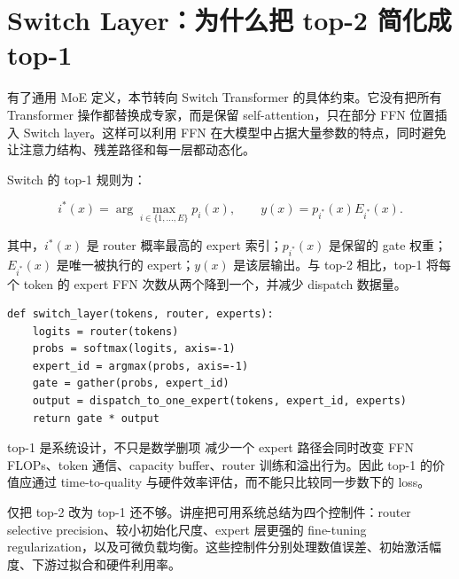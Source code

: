 \section{Switch Layer：为什么把 top-2 简化成 top-1}

有了通用 MoE 定义，本节转向 Switch Transformer 的具体约束。它没有把所有 Transformer 操作都替换成专家，而是保留 self-attention，只在部分 FFN 位置插入 Switch layer。这样可以利用 FFN 在大模型中占据大量参数的特点，同时避免让注意力结构、残差路径和每一层都动态化。


Switch 的 top-1 规则为：

\[
i^*(x)=\arg\max_{i\in\{1,\ldots,E\}}p_i(x),
\qquad
y(x)=p_{i^*}(x)E_{i^*}(x).
\]

其中，$i^*(x)$ 是 router 概率最高的 expert 索引；$p_{i^*}(x)$ 是保留的 gate 权重；$E_{i^*}(x)$ 是唯一被执行的 expert；$y(x)$ 是该层输出。与 top-2 相比，top-1 将每个 token 的 expert FFN 次数从两个降到一个，并减少 dispatch 数据量。

\begin{lstlisting}[caption={Switch top-1 路由的概念性伪代码。}]
def switch_layer(tokens, router, experts):
    logits = router(tokens)
    probs = softmax(logits, axis=-1)
    expert_id = argmax(probs, axis=-1)
    gate = gather(probs, expert_id)
    output = dispatch_to_one_expert(tokens, expert_id, experts)
    return gate * output
\end{lstlisting}

\begin{importantbox}{top-1 是系统设计，不只是数学删项}
减少一个 expert 路径会同时改变 FFN FLOPs、token 通信、capacity buffer、router 训练和溢出行为。因此 top-1 的价值应通过 time-to-quality 与硬件效率评估，而不能只比较同一步数下的 loss。
\end{importantbox}


仅把 top-2 改为 top-1 还不够。讲座把可用系统总结为四个控制件：router selective precision、较小初始化尺度、expert 层更强的 fine-tuning regularization，以及可微负载均衡。这些控制件分别处理数值误差、初始激活幅度、下游过拟合和硬件利用率。



